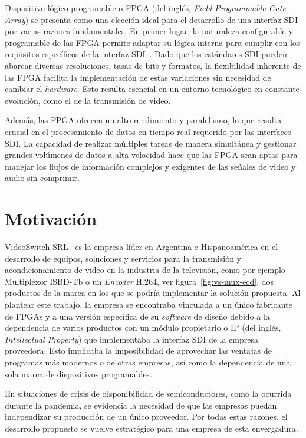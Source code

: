   Dispositivo lógico programable o FPGA (del inglés, \textit{Field-Programmable Gate Array}) se presenta como
  una elección ideal para el desarrollo de una interfaz SDI por varias razones
  fundamentales. En primer lugar, la naturaleza configurable y programable de las
  FPGA permite adaptar su lógica interna para cumplir con los requisitos
  específicos de la interfaz SDI~\citep{design}. Dado que los estándares SDI pueden abarcar
  diversas resoluciones, tasas de bits y formatos, la flexibilidad inherente de
  las FPGA facilita la implementación de estas variaciones sin necesidad de
  cambiar el \textit{hardware}. Esto resulta esencial en un entorno tecnológico
  en constante evolución, como el de la transmisión de video.

  Además, las FPGA ofrecen un alto rendimiento y paralelismo, lo que resulta
  crucial en el procesamiento de datos en tiempo real requerido por las interfaces
  SDI\@. La capacidad de realizar múltiples tareas de manera simultánea y gestionar
  grandes volúmenes de datos a alta velocidad hace que las FPGA sean aptas para
  manejar los flujos de información complejos y exigentes de las señales de video
  y audio sin comprimir.

\section{Motivación}

  VideoSwitch SRL~\citep{vs-srl} es la empresa líder en Argentina e Hispanoamérica
  en el desarrollo de equipos, soluciones y servicios para la transmisión y
  acondicionamiento de video en la industria de la televisión, como por ejemplo
  Multiplexor ISBD-Tb o un \textit{Encoder} H.264, ver figura~\ref{fig:vs-mux-ecd},
  dos productos de la marca en los que se podría implementar la solución propuesta.
  Al plantear este trabajo, la empresa se encontraba vinculada a un único
  fabricante de FPGAs y a una versión específica de su \textit{software} de
  diseño debido a la dependencia de varios productos con un módulo propietario o
  IP (del inglés, \textit{Intellectual Property}) que implementaba la interfaz SDI
  de la empresa proveedora. Esto implicaba la imposibilidad de aprovechar las
  ventajas de programas más modernos o de otras empresas, así como la dependencia
  de una sola marca de dispositivos programables.

  En situaciones de crisis de disponibilidad de semiconductores, como la ocurrida
  durante la pandemia, se evidencia la necesidad de que las empresas puedan
  independizar su producción de un único proveedor. Por todas estas razones, el
  desarrollo propuesto se vuelve estratégico para una empresa de esta envergadura.

